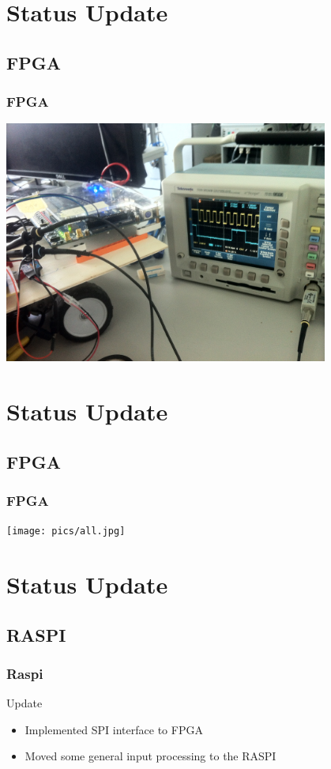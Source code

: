\documentclass[pdf]{beamer}
\begin{document}
\section{Status Update}
\subsection{FPGA}
\begin{frame}
\frametitle{FPGA}
  \begin{center}
  \includegraphics[width = 0.8\textwidth]{pics/i2c_am_oszi.JPG}
  \end{center}
\end{frame}

\section{Status Update}
\subsection{FPGA}
\begin{frame}
\frametitle{FPGA}
  \begin{center}
  \texttt{[image: pics/all.jpg]}
  \end{center}
\end{frame}

\section{Status Update}
\subsection{RASPI}
\begin{frame}
\frametitle{Raspi}
\begin{exampleblock}{Update}
\begin{itemize}
  \item Implemented SPI interface to FPGA
  \item Moved some general input processing to the RASPI
\end{itemize}
\end{exampleblock}
\end{frame}
\end{document}
